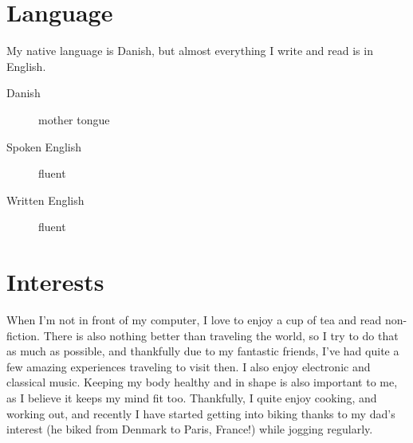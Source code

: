 \documentclass[margin,line]{resume}
\begin{document}
\begin{resume}
\section{\mysidestyle{} Language}
My native language is Danish, but almost everything I write and read is in English.

\begin{description}
  \item[Danish] mother tongue
  \item[Spoken English] fluent
  \item[Written English] fluent 
\end{description}

\section{\mysidestyle{} Interests}
When I'm not in front of my computer, I love to enjoy a cup of tea and read non-fiction. There is also nothing better than traveling the world, so I try to do that as much as possible, and thankfully due to my fantastic friends, I've had quite a few amazing experiences traveling to visit then. I also enjoy electronic and classical music. Keeping my body healthy and in shape is also important to me, as I believe it keeps my mind fit too. Thankfully, I quite enjoy cooking, and working out, and recently I have started getting into biking thanks to my dad's interest (he biked from Denmark to Paris, France!) while jogging regularly.
\end{resume}
\end{document}
